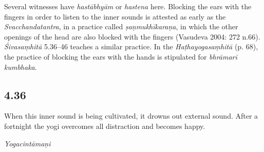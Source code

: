 \begin{ekdosis}
\begin{philcomm}[hp04_035]
Several witnesses have \emph{hastābhyām} or \emph{hastena} here. Blocking the ears with the fingers in order to listen to the inner sounds is attested as early as the \textit{Svacchandatantra}, in a practice called \textit{ṣaṇmukhīkaraṇa}, in which the other openings of the head are also blocked with the fingers (Vasudeva 2004: 272 n.66). \emph{Śivasaṃhitā} 5.36–46 teaches a similar practice.
In the \textit{Haṭhayogasaṃhitā} (p. 68), the practice of blocking the ears with the hands is stipulated for \textit{bhrāmarī kumbhaka}.
\end{philcomm}

\subsection*{4.36}
\begin{translation}[hp04_036]
When this inner sound is being cultivated, it drowns out external sound. After a fortnight the yogi overcomes all distraction and becomes happy.
\end{translation}


\begin{testimonia}[hp04_036]
\emph{Yogacintāmaṇi}
\begin{versinnote}
\end{versinnote}


\end{testimonia}
\end{ekdosis}
